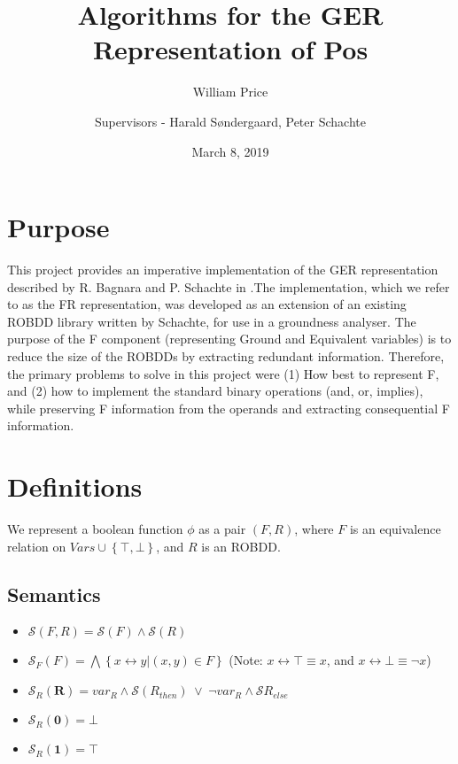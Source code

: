 \documentclass[11pt,table]{article}
\title{Algorithms for the GER Representation of Pos}
\author{William Price \quad 917093}
\author{Supervisors - Harald S{\o}ndergaard, Peter Schachte}
\date{March 8, 2019}                                           %
\newcounter{r}
\newcommand{\biim}{\leftrightarrow}
\begin{document}
\maketitle


\section{Purpose}

This project provides an imperative implementation of the GER representation described by R. Bagnara and P. Schachte in \cite{bag_schachteGER}.The implementation, which we refer to as the FR representation, was developed as an extension of an existing ROBDD library written by Schachte, for use in a groundness analyser. The purpose of the F component (representing Ground and Equivalent variables) is to reduce the size of the ROBDDs by extracting redundant information. Therefore, the primary problems to solve in this project were (1) How best to represent F, and (2) how to implement the standard binary operations (and, or, implies), while preserving F information from the operands and extracting consequential F information.




\section{Definitions}
We represent a boolean function $\phi$ as a pair $ (F,R) $, where $ F $ is an equivalence relation on $ Vars \cup \left\lbrace \top, \bot \right\rbrace  $, and $ R $ is an ROBDD.

\subsection{Semantics}
\begin{itemize}
	\item $ \mathcal{S}(F,R) =  \mathcal{S}(F) \wedge  \mathcal{S}(R) $
	
	\item $\mathcal{S}_F(F) = \bigwedge \left\lbrace x \biim y | (x,y)\in F\right\rbrace $ \hspace{1in} (Note: $ x \biim \top \equiv x $, and $ x \biim \bot \equiv \neg x $)
	
	\item  $ \mathcal{S}_R(\textbf{R}) = var_R \wedge \mathcal{S}(R_{then}) \hspace{3pt} \vee \hspace{3pt} \neg var_R \wedge \mathcal{S}R_{else}$
	
	\item $ \mathcal{S}_R(\textbf{0}) = \bot $
	
	\item $ \mathcal{S}_R(\textbf{1}) = \top $
\end{itemize}
\end{document}

